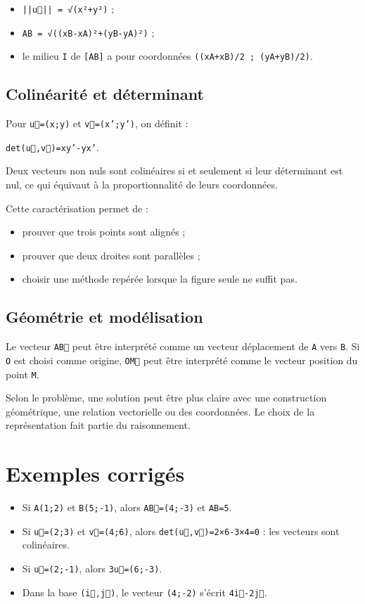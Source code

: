 \begin{itemize}
\item \texttt{||u⃗|| = √(x²+y²)} ;
\item \texttt{AB = √((xB-xA)²+(yB-yA)²)} ;
\item le milieu \texttt{I} de \texttt{[AB]} a pour coordonnées \texttt{((xA+xB)/2 ; (yA+yB)/2)}.
\end{itemize}

\subsection{Colinéarité et déterminant}

Pour \texttt{u⃗=(x;y)} et \texttt{v⃗=(x';y')}, on définit :

\texttt{det(u⃗,v⃗)=xy'-yx'}.

Deux vecteurs non nuls sont colinéaires si et seulement si leur déterminant est nul, ce qui équivaut à la proportionnalité de leurs coordonnées.

Cette caractérisation permet de :

\begin{itemize}
\item prouver que trois points sont alignés ;
\item prouver que deux droites sont parallèles ;
\item choisir une méthode repérée lorsque la figure seule ne suffit pas.
\end{itemize}

\subsection{Géométrie et modélisation}

Le vecteur \texttt{AB⃗} peut être interprété comme un vecteur déplacement de \texttt{A} vers \texttt{B}. Si \texttt{O} est choisi comme origine, \texttt{OM⃗} peut être interprété comme le vecteur position du point \texttt{M}.

Selon le problème, une solution peut être plus claire avec une construction géométrique, une relation vectorielle ou des coordonnées. Le choix de la représentation fait partie du raisonnement.

\section{Exemples corrigés}

\begin{itemize}
\item Si \texttt{A(1;2)} et \texttt{B(5;-1)}, alors \texttt{AB⃗=(4;-3)} et \texttt{AB=5}.
\item Si \texttt{u⃗=(2;3)} et \texttt{v⃗=(4;6)}, alors \texttt{det(u⃗,v⃗)=2×6-3×4=0} : les vecteurs sont colinéaires.
\item Si \texttt{u⃗=(2;-1)}, alors \texttt{3u⃗=(6;-3)}.
\item Dans la base \texttt{(i⃗,j⃗)}, le vecteur \texttt{(4;-2)} s'écrit \texttt{4i⃗-2j⃗}.
\end{itemize}

